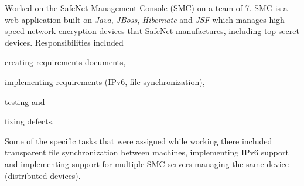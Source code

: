 \documentclass[a4paper,margin,line]{resume}
\newcommand{\rurl}[1]{\hfill {\footnotesize \url{#1}}}
\newcommand{\rdate}[1]{\hfill {\small #1}}
\renewcommand{\employer}[5]{\item[#1] - #2 \rdate{#3} \\* #4 \rurl{#5} \\*}
\begin{document}
\begin{resume}
\begin{asparadesc}
		\small
		Worked on the SafeNet Management Console (SMC) on a team of 7. SMC is a web application built on \emph{Java}, \emph{JBoss}, \emph{Hibernate} and \emph{JSF} which manages high speed network encryption devices that SafeNet manufactures, including top-secret devices. Responsibilities included \begin{inparaenum} \item creating requirements documents, \item implementing requirements (IPv6, file synchronization), \item testing and \item fixing defects. \end{inparaenum} Some of the specific tasks that were assigned while working there included transparent file synchronization between machines, implementing IPv6 support and implementing support for multiple SMC servers managing the same device (distributed devices).
		\normalsize
		\\
%
%		
	\end{asparadesc}


\end{resume}
\end{document}
